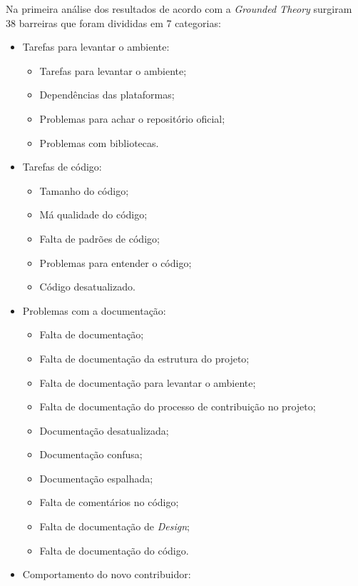 Na primeira análise dos resultados de acordo com a \textit{Grounded Theory} surgiram 
38 barreiras que foram divididas em 7 categorias:

\begin{itemize}

\item Tarefas para levantar o ambiente: 

	\begin{itemize}
	\item Tarefas para levantar o ambiente; 
	\item Dependências das plataformas;
	\item Problemas para achar o repositório oficial;
	\item Problemas com bibliotecas.
	\end{itemize}

\item Tarefas de código:
	
	\begin{itemize}
	\item Tamanho do código;
	\item Má qualidade do código;
	\item Falta de padrões de código;
	\item Problemas para entender o código;
	\item Código desatualizado.
	\end{itemize}

\item Problemas com a documentação:

	\begin{itemize}
	\item Falta de documentação;
	\item Falta de documentação da estrutura do projeto;
	\item Falta de documentação para levantar o ambiente;
	\item Falta de documentação do processo de contribuição no projeto;
	\item Documentação desatualizada;
	\item Documentação confusa;
	\item Documentação espalhada;
	\item Falta de comentários no código;
	\item Falta de documentação de \textit{Design};
	\item Falta de documentação do código.
	\end{itemize}

\item Comportamento do novo contribuidor:


\end{itemize}
